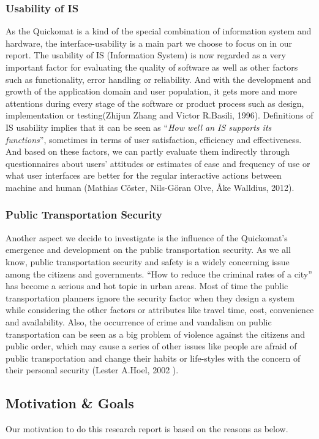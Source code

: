 \documentclass[twocolumn]{article}
\begin{document}
\subsubsection{Usability of IS}
As the Quickomat is a kind of the special combination of information system and hardware, the interface-usability is a main part we choose to focus on in our report. The usability of IS (Information System) is now regarded as a very important factor for evaluating the quality of software as well as other factors such as  functionality, error handling or reliability. And with the development and growth of the application domain and user population, it gets more and more attentions during every stage of the software or product process such as design, implementation or testing(Zhijun Zhang and Victor R.Basili, 1996). Definitions of IS usability implies that it can be seen as  “\emph{How well an IS supports its functions}”, sometimes in terms of user satisfaction, efficiency and effectiveness. And based on these factors, we can partly evaluate them indirectly through questionnaires about users’ attitudes or estimates of ease and frequency of use or what user interfaces are better for the regular interactive actions between machine and human (Mathias Cöster, Nils-Göran Olve, Åke Walldius, 2012).

\subsubsection{Public Transportation Security}
Another aspect we decide to investigate is the influence of the Quickomat’s emergence and development on the public transportation security. As we all know, public transportation security and safety is a widely concerning issue among the citizens and governments. “How to reduce the criminal rates of a city” has become a serious and hot topic in urban areas. Most of time the public transportation planners ignore the security factor when they design a system while considering the other factors or attributes like travel time, cost, convenience and availability.  Also, the occurrence of crime and vandalism on public transportation can be seen as a big problem of violence against the citizens and public order, which may cause a series of other issues like people are afraid of public transportation and change their habits or life-styles with the concern of their personal security (Lester A.Hoel, 2002 ). 

\subsection{Motivation \& Goals}
Our motivation to do this research report is based on the reasons as below.
\end{document}
